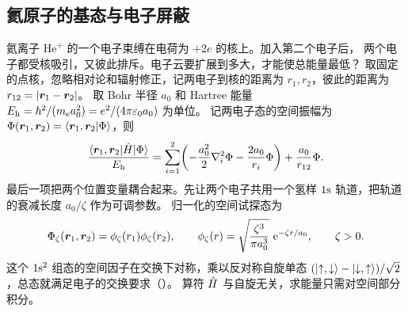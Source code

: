 \subsection{氦原子的基态与电子屏蔽}
\label{ss:qm-helium-ground}
氦离子 $\mathrm{He}^+$ 的一个电子束缚在电荷为 $+2e$ 的核上。加入第二个电子后，
两个电子都受核吸引，又彼此排斥。电子云要扩展到多大，才能使总能量最低？
取固定的点核，忽略相对论和辐射修正，记两电子到核的距离为 $r_1,r_2$，彼此的距离为 $r_{12} = \lvert\bm r_1 - \bm r_2\rvert$。
取 Bohr 半径 $a_0$ 和 Hartree 能量 $E_{\mathrm h} = \hbar^2/(m_{\mathrm{e}} a_0^2) = e^2/(4\pi\varepsilon_0 a_0)$ 为单位。
记两电子态的空间振幅为 $\Phi(\bm r_1,\bm r_2) = \langle\bm r_1,\bm r_2\vert\Phi\rangle$，则
\begin{equation}\label{eq:qm-helium-scaled-hamiltonian}
    \frac{\langle\bm r_1,\bm r_2\vert\hat{H}\vert\Phi\rangle}{E_{\mathrm h}}
    = \sum_{i=1}^2\biggl(-\frac{a_0^2}{2}\nabla_i^2\Phi - \frac{2a_0}{r_i}\Phi\biggr)
        + \frac{a_0}{r_{12}}\Phi .
\end{equation}
最后一项把两个位置变量耦合起来。先让两个电子共用一个氢样 $1\mathrm{s}$ 轨道，把轨道的衰减长度 $a_0/\zeta$ 作为可调参数\cite{mithelium}。
归一化的空间试探态为
\begin{equation}\label{eq:qm-helium-product-trial}
    \Phi_\zeta(\bm r_1,\bm r_2) = \phi_\zeta(r_1)\phi_\zeta(r_2),\qquad
    \phi_\zeta(r) = \sqrt{\frac{\zeta^3}{\pi a_0^3}}\,\mathop{}\!\mathrm{e}^{-\zeta r/a_0},\qquad \zeta > 0 .
\end{equation}
这个 $1\mathrm{s}^2$ 组态的空间因子在交换下对称，乘以反对称自旋单态
$(\lvert\mathord{\uparrow},\mathord{\downarrow}\rangle - \lvert\mathord{\downarrow},\mathord{\uparrow}\rangle)/\sqrt2$，总态就满足电子的交换要求（）。
算符 $\hat{H}$ 与自旋无关，求能量只需对空间部分积分。

